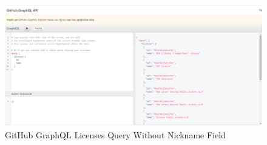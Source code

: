 \begin{figure}[!ht]
  \centering\includegraphics[width=\columnwidth]{images/github-graphql-2.png}
  \caption{GitHub GraphQL Licenses Query Without Nickname Field}\label{f:github-graphql-2}
\end{figure}
